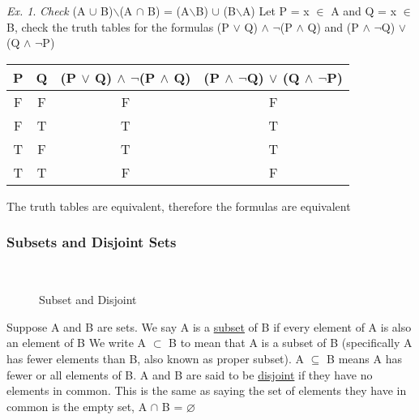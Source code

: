 \documentclass[11pt]{article}
\newcommand{\incsvg}[2]{%
    \def\svgwidth{\columnwidth}
    \graphicspath{{#1}}
    
}
\theoremstyle{definition}
\theoremstyle{remark}
\newtheorem{exer}{Ex.}
\begin{document}
\begin{exer}
    \textit{Check} (A $\cup$ B)$\backslash$(A $\cap$ B) = (A$\backslash$B) $\cup$ (B$\backslash$A)  \newline
    Let P = x $\in$ A and Q = x $\in$ B, check the truth tables for the formulas\newline
    (P $\lor$ Q) $\land$ $\neg$(P $\land$ Q) and (P $\land$ $\neg$Q) $\lor$ (Q $\land$ $\neg$P)
    \begin{center}
    \begin{tabular}{c c|c|c}
            
                P & Q & (P $\lor$ Q) $\land$ $\neg$(P $\land$ Q) &  (P $\land$ $\neg$Q) $\lor$ (Q $\land$ $\neg$P) \\
            \hline
                F & F & F & F  \\
                F & T & T & T  \\
                T & F & T & T  \\
                T & T & F & F  \\
            
    \end{tabular}
    \end{center}
    The truth tables are equivalent, therefore the formulas are equivalent
\end{exer}
\newpage
\subsubsection{Subsets and Disjoint Sets}


\begin{figure}[ht!]
	\centering
	\caption{Subset and Disjoint}
	\incsvg{images}{images/vennsubset}\\
	\label{fig:vennsubset}
\end{figure}
\begin{shaded}
    Suppose A and B are sets. We say A is a \underline{subset} of B if every element of A is also an element of B
    We write A $\subset$ B to mean that A is a subset of B (specifically A has fewer elements than B, also known as proper subset).
    A $\subseteq$ B means A has fewer or all elements of B.\newline
    A and B are said to be \underline{disjoint} if they have no elements
    in common. This is the same as saying the set of elements they have in common is the empty set, A $\cap$ B = $\varnothing$    
\end{shaded}
\end{document}
